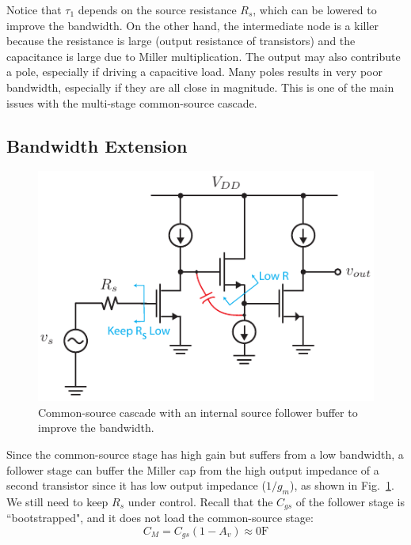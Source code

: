 Notice that $\tau_1$ depends on the source resistance $R_s$, which can be lowered to improve the bandwidth.  On the other hand,  the intermediate node is a killer because the resistance is large (output resistance of transistors) and the capacitance is large due to Miller multiplication.   The output may also contribute a pole, especially if driving a capacitive load.  Many poles results in very poor bandwidth, especially if they are all close in magnitude.  This is one of the main issues with the multi-stage common-source cascade. 
 



\subsection{Bandwidth Extension}


\begin{figure}[tb]
\begin{center}
\includegraphics[scale=1]{55cs_cd_cs_casc}
\end{center}
\caption{Common-source cascade with an internal source follower buffer to improve the bandwidth.} \label{fig:55cs_cd_cs_casc}
\end{figure}

Since the common-source stage has high gain but suffers from a low bandwidth, a follower stage can buffer the Miller cap from the high output impedance of a second transistor since it has low output impedance ($1/g_m$), as shown in Fig.~\ref{fig:55cs_cd_cs_casc}.  We still need to keep $R_s$ under control.  Recall that the $C_{gs}$ of the follower stage is ``bootstrapped", and it does not load the common-source stage:
%
\begin{equation}
	C_M = C_{gs} (1 - A_v) \approx 0 \mathrm{F}
\end{equation}
%


